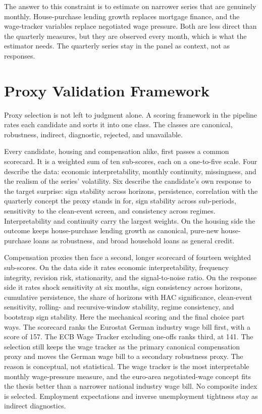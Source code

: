 The answer to this constraint is to estimate on narrower series that are genuinely monthly. House-purchase lending growth replaces mortgage finance, and the wage-tracker variables replace negotiated wage pressure. Both are less direct than the quarterly measures, but they are observed every month, which is what the estimator needs. The quarterly series stay in the panel as context, not as responses.

\section{Proxy Validation Framework}

Proxy selection is not left to judgment alone. A scoring framework in the pipeline rates each candidate and sorts it into one class. The classes are canonical, robustness, indirect, diagnostic, rejected, and unavailable.

Every candidate, housing and compensation alike, first passes a common scorecard. It is a weighted sum of ten sub-scores, each on a one-to-five scale. Four describe the data: economic interpretability, monthly continuity, missingness, and the realism of the series' volatility. Six describe the candidate's own response to the target surprise: sign stability across horizons, persistence, correlation with the quarterly concept the proxy stands in for, sign stability across sub-periods, sensitivity to the clean-event screen, and consistency across regimes. Interpretability and continuity carry the largest weights. On the housing side the outcome keeps house-purchase lending growth as canonical, pure-new house-purchase loans as robustness, and broad household loans as general credit.

Compensation proxies then face a second, longer scorecard of fourteen weighted sub-scores. On the data side it rates economic interpretability, frequency integrity, revision risk, stationarity, and the signal-to-noise ratio. On the response side it rates shock sensitivity at six months, sign consistency across horizons, cumulative persistence, the share of horizons with HAC significance, clean-event sensitivity, rolling- and recursive-window stability, regime consistency, and bootstrap sign stability. Here the mechanical scoring and the final choice part ways. The scorecard ranks the Eurostat German industry wage bill first, with a score of 157. The ECB Wage Tracker excluding one-offs ranks third, at 141. The selection still keeps the wage tracker as the primary canonical compensation proxy and moves the German wage bill to a secondary robustness proxy. The reason is conceptual, not statistical. The wage tracker is the most interpretable monthly wage-pressure measure, and the euro-area negotiated-wage concept fits the thesis better than a narrower national industry wage bill. No composite index is selected. Employment expectations and inverse unemployment tightness stay as indirect diagnostics.

